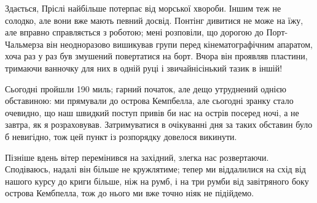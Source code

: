Здається, Пріслі найбільше потерпає від морської хвороби. Іншим теж не солодко,
але вони вже мають певний досвід. Понтінг дивитися не може на їжу, але вправно
справляється з роботою; мені розповіли, що дорогою до Порт-Чальмерза він
неодноразово вишикував групи перед кінематографічним апаратом, хоча раз у раз
був змушений повертатися на борт. Вчора він проявляв пластини, тримаючи
ванночку для них в одній руці і звичайнісінький тазик в іншій!

Сьогодні пройшли 190 миль; гарний початок, але дещо утруднений однією
обставиною: ми прямували до острова Кемпбелла, але сьогодні зранку стало
очевидно, що наш швидкий поступ привів би нас на острів посеред ночі, а не
завтра, як я розраховував. Затримуватися в очікуванні дня за таких обставин
було б невигідно, тож цей пункт із розпорядку довелося викинути.

Пізніше вдень вітер перемінився на західний, злегка нас розвертаючи.
Сподіваюсь, надалі він більше не кружлятиме; тепер ми віддалилися на схід від
нашого курсу до криги більше, ніж на румб, і на три румби від завітряного боку
острова Кембпелла, тож до нього ми вже точно ніяк не підійдемо.
